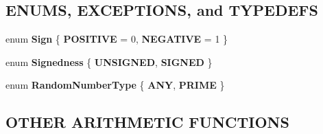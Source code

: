 \subsection*{ENUMS, EXCEPTIONS, and TYPEDEFS}
\label{_amgrpa03118083bc7586a83a4ee7290b05995}
 \begin{DoxyCompactItemize}
\item 
enum {\bfseries Sign} \{ {\bfseries POSITIVE} = 0, 
{\bfseries NEGATIVE} = 1
 \}
\item 
enum {\bfseries Signedness} \{ {\bfseries UNSIGNED}, 
{\bfseries SIGNED}
 \}
\item 
enum {\bfseries RandomNumberType} \{ {\bfseries ANY}, 
{\bfseries PRIME}
 \}
\end{DoxyCompactItemize}
\subsection*{OTHER ARITHMETIC FUNCTIONS}
\label{_amgrp9b2e3a5f8113660d4333aeae3c0867b1}
